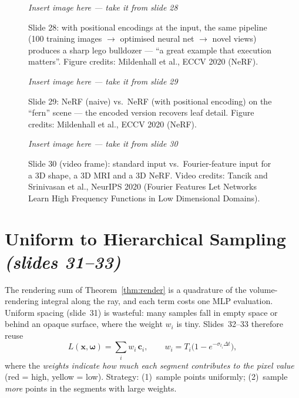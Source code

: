 \documentclass[11pt,a4paper]{article}
\newcommand{\xx}{\boldsymbol{x}}
\newcommand{\om}{\boldsymbol{\omega}}
\newcommand{\cc}{\boldsymbol{c}}
\newcommand{\sref}[1]{\texorpdfstring{\emph{(slides #1)}}{(slides #1)}}
\theoremstyle{definition}
\theoremstyle{plain}
\newcommand{\slideimg}[3]{%
\begin{figure}[H]
\centering
\begin{tcolorbox}[enhanced,colback=white,colframe=white,boxrule=0pt,sharp corners,overlay={\draw[dashed,gray,thick] (frame.south west) rectangle (frame.north east);},
  width=0.92\linewidth,height=#2,valign=center,halign=center]
{\color{gray}\itshape Insert image here --- take it from slide #1}
\end{tcolorbox}
\caption{#3}
\end{figure}}
\begin{document}
\slideimg{28}{4.8cm}{Slide 28: with positional encodings at the input, the same pipeline (100 training images $\to$ optimised neural net $\to$ novel views) produces a sharp lego bulldozer --- ``a great example that execution matters''. Figure credits: Mildenhall et al., ECCV 2020 (NeRF).}

\slideimg{29}{4.6cm}{Slide 29: NeRF (naive) vs.\ NeRF (with positional encoding) on the ``fern'' scene --- the encoded version recovers leaf detail. Figure credits: Mildenhall et al., ECCV 2020 (NeRF).}

\slideimg{30}{4.6cm}{Slide 30 (video frame): standard input vs.\ Fourier-feature input for a 3D shape, a 3D MRI and a 3D NeRF. Video credits: Tancik and Srinivasan et al., NeurIPS 2020 (Fourier Features Let Networks Learn High Frequency Functions in Low Dimensional Domains).}

\section{Uniform to Hierarchical Sampling \sref{31--33}}

The rendering sum of Theorem~\ref{thm:render} is a quadrature of the volume-rendering integral along the ray, and each term costs one MLP evaluation. Uniform spacing (slide~31) is wasteful: many samples fall in empty space or behind an opaque surface, where the weight $w_i$ is tiny. Slides~32--33 therefore reuse
\[
L(\xx,\om)=\sum_iw_i\,\cc_i,\qquad w_i=T_i\big(1-e^{-\sigma_{t_i}\Delta t}\big),
\]
where the \emph{weights indicate how much each segment contributes to the pixel value} (red = high, yellow = low). Strategy: (1)~sample points uniformly; (2)~sample \emph{more} points in the segments with large weights.
\end{document}
